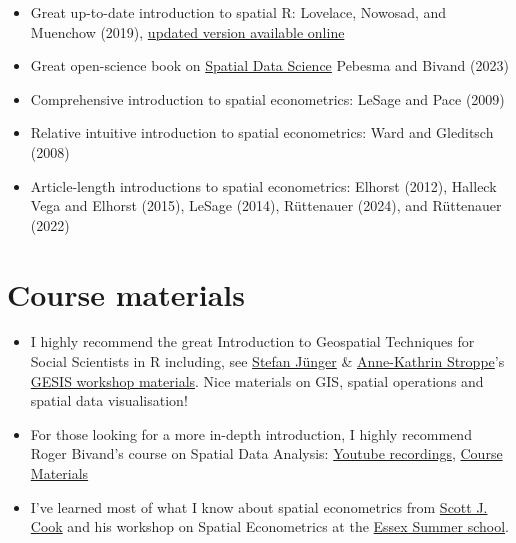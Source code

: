 \documentclass[
  letterpaper,
  DIV=11,
  numbers=noendperiod]{scrreprt}
\begin{document}

\begin{itemize}
\item
  Great up-to-date introduction to spatial R: Lovelace, Nowosad, and
  Muenchow (2019), \href{https://geocompr.robinlovelace.net/}{updated
  version available online}
\item
  Great open-science book on
  \href{https://www.r-spatial.org/book}{Spatial Data Science} Pebesma
  and Bivand (2023)
\item
  Comprehensive introduction to spatial econometrics: LeSage and Pace
  (2009)
\item
  Relative intuitive introduction to spatial econometrics: Ward and
  Gleditsch (2008)
\item
  Article-length introductions to spatial econometrics: Elhorst (2012),
  Halleck Vega and Elhorst (2015), LeSage (2014), Rüttenauer (2024), and
  Rüttenauer (2022)
\end{itemize}

\hypertarget{course-materials}{%
\section*{Course materials}\label{course-materials}}


\begin{itemize}
\item
  I highly recommend the great Introduction to Geospatial Techniques for
  Social Scientists in R including, see
  \href{https://stefanjuenger.github.io/}{Stefan Jünger} \&
  \href{https://www.gesis.org/institut/mitarbeitendenverzeichnis/person/Anne-Kathrin.Stroppe}{Anne-Kathrin
  Stroppe}'s
  \href{https://github.com/StefanJuenger/gesis-workshop-geospatial-techniques-R-2023}{GESIS
  workshop materials}. Nice materials on GIS, spatial operations and
  spatial data visualisation!
\item
  For those looking for a more in-depth introduction, I highly recommend
  Roger Bivand's course on Spatial Data Analysis:
  \href{https://www.youtube.com/watch?v=KkIbg50Pa0I\&list=PLXUoTpMa_9s10NVk4dBQljNOaOXAOhcE0}{Youtube
  recordings}, \href{https://rsbivand.github.io/ECS530_h19/}{Course
  Materials}
\item
  I've learned most of what I know about spatial econometrics from
  \href{http://www.scottjcook.net/}{Scott J. Cook} and his workshop on
  Spatial Econometrics at the
  \href{https://essexsummerschool.com/summer-school-facts/courses/ess-2023-course-list/}{Essex
  Summer school}.
\end{itemize}
\end{document}
